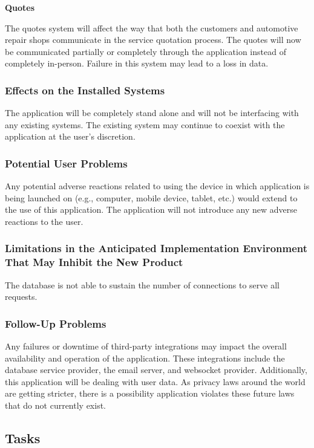 \documentclass[12pt]{article}
\begin{document}
\textbf{Quotes}

The quotes system will affect the way that both the customers and automotive repair shops
communicate in the service quotation process. The quotes will now be communicated partially or
completely through the application instead of completely in-person. Failure in this system may lead
to a loss in data.

\subsubsection{Effects on the Installed Systems}

The application will be completely stand alone and will not be interfacing with any existing
systems. The existing system may continue to coexist with the application at the user's discretion.

\subsubsection{Potential User Problems}

Any potential adverse reactions related to using the device in which application is being launched
on (e.g., computer, mobile device, tablet, etc.) would extend to the use of this application. The
application will not introduce any new adverse reactions to the user.

\subsubsection{Limitations in the Anticipated Implementation Environment That May Inhibit the New Product}

The database is not able to sustain the number of connections to serve all requests.

\subsubsection{Follow-Up Problems}

Any failures or downtime of third-party integrations may impact the overall availability and
operation of the application. These integrations include the database service provider, the email
server, and websocket provider. Additionally, this application will be dealing with user data. As
privacy laws around the world are getting stricter, there is a possibility application violates
these future laws that do not currently exist.

\subsection{Tasks}
\end{document}
